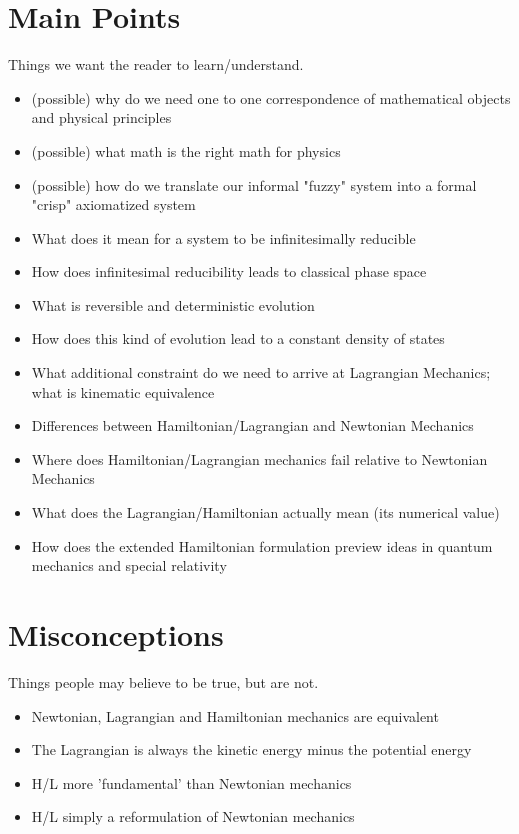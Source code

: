 \documentclass{article}
\begin{document}
\section{Main Points}
Things we want the reader to learn/understand.


\begin{itemize}

\item (possible) why do we need one to one correspondence of mathematical objects and physical principles
\item (possible) what math is the right math for physics
\item (possible) how do we translate our informal "fuzzy" system into a formal "crisp" axiomatized system

	\item What does it mean for a system to be infinitesimally reducible
	\item How does infinitesimal reducibility leads to classical phase space
	\item What is reversible and deterministic evolution
	\item How does this kind of evolution lead to a constant density of states
	\item What additional constraint do we need to arrive at Lagrangian Mechanics; what is kinematic equivalence
	\item Differences between Hamiltonian/Lagrangian and Newtonian Mechanics
	\item Where does Hamiltonian/Lagrangian mechanics fail relative to Newtonian Mechanics
	\item What does the Lagrangian/Hamiltonian actually mean (its numerical value)
	\item How does the extended Hamiltonian formulation preview ideas in quantum mechanics and special relativity
\end{itemize}


\section{Misconceptions}
Things people may believe to be true, but are not.

\begin{itemize}
	\item Newtonian, Lagrangian and Hamiltonian mechanics are equivalent
	\item The Lagrangian is always the kinetic energy minus the potential energy 
	\item H/L more 'fundamental' than Newtonian mechanics
	\item H/L simply a reformulation of Newtonian mechanics
\end{itemize}
\end{document}
